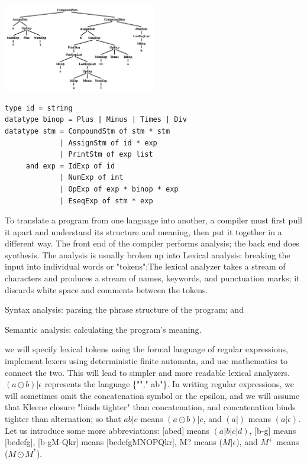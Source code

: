 \documentclass[8pt, a4paper, oneside, twocolumn]{extarticle}
\begin{document}
\includegraphics[width=0.5\textwidth,height=0.5\textheight,keepaspectratio]{slpt}

\begin{verbatim}
type id = string
datatype binop = Plus | Minus | Times | Div
datatype stm = CompoundStm of stm * stm
             | AssignStm of id * exp
             | PrintStm of exp list
     and exp = IdExp of id
             | NumExp of int
             | OpExp of exp * binop * exp
             | EseqExp of stm * exp
\end{verbatim}
To translate a program from one language into another, a compiler must first 
pull it apart and understand its structure and meaning, then put it together in a 
different way. The front end of the compiler performs analysis; the back end 
does synthesis. 
The analysis is usually broken up into 
Lexical analysis: breaking the input into individual words or "tokens";The lexical analyzer takes a stream of characters and produces a stream of 
names, keywords, and punctuation marks;  it discards white space and comments between the tokens. 

Syntax analysis: parsing the phrase structure of the program; and 

Semantic analysis: calculating the program's meaning. 

we will specify lexical tokens using the formal language of regular 
expressions, implement lexers using deterministic finite automata, and use 
mathematics to connect the two. This will lead to simpler and more readable 
lexical analyzers. 
$(a \odot b) \vert \epsilon$ represents the language \{""," ab"\}. 
In writing regular expressions, we will sometimes omit the concatenation 
symbol or the epsilon, and we will assume that Kleene closure "binds tighter" 
than concatenation, and concatenation binds tighter than alternation; so that 
$ab \vert c$ means $(a \odot b) \vert c$, and $(a \vert)$ means $(a \vert \epsilon)$. 
Let us introduce some more abbreviations: [abed] means 
$(a \vert b \vert c \vert 
d)$, [b-g] means [bedefg], [b-gM-Qkr] means [bcdefgMNOPQkr], M? 
means ($M \vert \epsilon$), and $M^+$ means ($M \odot M^*$). 
\end{document}
